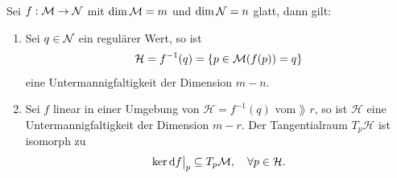 \begin{kor}
Sei $f: \mathcal{M} \to \mathcal{N}$ mit $\dim \mathcal{M} = m$ und $\dim \mathcal{N} = n$ glatt, dann gilt:
\begin{enumerate}
\item Sei $q \in \mathcal{N}$ ein regulärer Wert, so ist 
\begin{align}
\mathcal{H} = f^{-1}(q) = \{ p \in \mathcal{M} (f(p))=q \}
\end{align}
eine Untermannigfaltigkeit der Dimension $m-n$.
\item Sei $f$ linear in einer Umgebung von $\mathcal{H} = f^{-1}(q)$ vom $\rang$ $r$, so ist $\mathcal{H}$ eine Untermannigfaltigkeit der Dimension $m-r$.
Der Tangentialraum $T_p \mathcal{H}$ ist isomorph zu
\begin{align}
\ker \dd f \big\vert_p \subseteq T_{p} \mathcal{M}, \quad \forall p \in \mathcal{H}.
\end{align}
\end{enumerate} 
\end{kor}